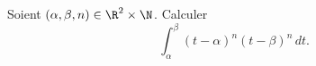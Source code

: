 Soient $(\alpha, \beta, n) \in \R^2 \times \N$. Calculer 
\[ \int_{\alpha}^{\beta} (t-\alpha)^n (t - \beta)^n \, dt.\]